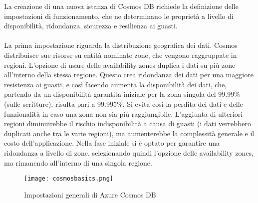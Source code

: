 La creazione di una nuova istanza di Cosmos DB
richiede la definizione delle impostazioni di funzionamento,
che ne determinano le proprietà a livello di 
disponibilità, ridondanza, sicurezza e resilienza ai guasti.\\
\\
La prima impostazione riguarda la distribuzione geografica dei dati.
Cosmos distribuisce sue risorse su entità nominate zone, che vengono raggruppate in regioni.
L'opzione di usare delle availability zones duplica i dati
su più zone all'interno della stessa regione.
Questo crea ridondanza dei dati per una maggiore resistenza ai guasti,
e così facendo aumenta la disponibilità dei dati,
che,
partendo da un disponibilità garantita iniziale per la zona singola del 99.99\% (sulle scritture),
risulta pari a 99.995\%.
Si evita così la perdita dei dati e delle funzionalità
in caso una zona non sia più raggiungibile.
L'aggiunta di ulteriori regioni diminuirebbe il rischio indisponibilità a causa di guasti
(i dati verrebbero duplicati anche tra le varie regioni),
ma aumenterebbe la complessità generale e il costo dell'applicazione.
Nella fase iniziale si è optato per garantire una ridondanza a livello di zone,
selezionando quindi l'opzione delle availability zones,
ma rimanendo all'interno di una singola regione.\\

\begin{figure}[h!]
    \centering
    \texttt{[image: cosmosbasics.png]}
    \caption{Impostazioni generali di Azure Cosmos DB}
\end{figure}

